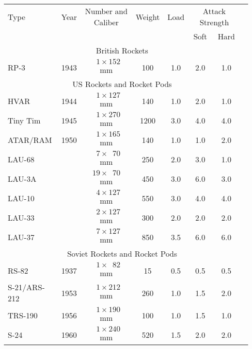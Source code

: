 \begin{twocolumntablefloat}
\begin{twocolumntable}
\begin{tabular}{lrcccccl}
\toprule
Type&
Year&
Number and Caliber&
Weight&
Load&
\multicolumn{2}{c}{Attack Strength}\\
\cmidrule{6-7}
&&&&&Soft&Hard\\
\midrule
\multicolumn{7}{c}{British Rockets}\\
\midrule
RP-3     &1943&$\phantom{0}1 \times \phantom{}152$ mm&\phantom{0}100&1.0&2.0&1.0\\
\midrule
\multicolumn{7}{c}{US Rockets and Rocket Pods}\\
\midrule
HVAR            &1944&$\phantom{0}1 \times \phantom{}127$ mm&\phantom{0}140&1.0&2.0&1.0\\
Tiny Tim        &1945&$\phantom{0}1 \times \phantom{}270$ mm&\phantom{}1200&3.0&4.0&4.0\\
ATAR/RAM        &1950&$\phantom{0}1 \times \phantom{}165$ mm&\phantom{0}140&1.0&1.0&2.0\\
\addlinespace
LAU-68          &    &$\phantom{0}7 \times \phantom{0}70$ mm&\phantom{0}250&2.0&3.0&1.0\\
LAU-3A          &    &$\phantom{}19 \times \phantom{0}70$ mm&\phantom{0}450&3.0&6.0&3.0\\
LAU-10          &    &$\phantom{0}4 \times \phantom{}127$ mm&\phantom{0}550&3.0&4.0&4.0\\
LAU-33          &    &$\phantom{0}2 \times \phantom{}127$ mm&\phantom{0}300&2.0&2.0&2.0\\
LAU-37          &    &$\phantom{0}7 \times \phantom{}127$ mm&\phantom{0}850&3.5&6.0&6.0\\
\midrule
\multicolumn{7}{c}{Soviet Rockets and Rocket Pods}\\
\midrule
RS-82           &1937&$\phantom{0}1 \times \phantom{0}82$ mm&\phantom{00}15&0.5&0.5&0.5\\
S-21/ARS-212    &1953&$\phantom{0}1 \times \phantom{}212$ mm&\phantom{0}260&1.0&1.5&2.0\\
TRS-190         &1956&$\phantom{0}1 \times \phantom{}190$ mm&\phantom{0}100&1.0&1.5&1.0\\
S-24            &1960&$\phantom{0}1 \times \phantom{}240$ mm&\phantom{0}520&1.5&2.0&2.0\\

\end{tabular}
\end{twocolumntable}
\end{twocolumntablefloat}
